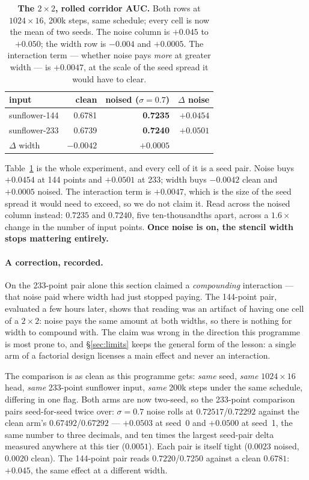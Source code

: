 \documentclass[10pt]{article}
\begin{document}
\begin{table}[htbp]
\centering\small
\begin{tabular}{lrrr}
\toprule
input & clean & noised ($\sigma{=}0.7$) & $\Delta$ noise \\
\midrule
sunflower-144 & 0.6781 & \textbf{0.7235} & $+0.0454$ \\
sunflower-233 & 0.6739 & \textbf{0.7240} & $+0.0501$ \\
\midrule
$\Delta$ width & $-0.0042$ & $+0.0005$ & \\
\bottomrule
\end{tabular}
\caption{\textbf{The $2\times2$, rolled corridor AUC.} Both rows at
$1024\times16$, 200k steps, same schedule; every cell is now the mean
of two seeds. The noise column is $+0.045$ to $+0.050$; the width row
is $-0.004$ and $+0.0005$. The interaction term --- whether noise pays
\emph{more} at greater width --- is $+0.0047$, at the scale of the seed
spread it would have to clear.}
\label{tab:twobytwo}
\end{table}

Table~\ref{tab:twobytwo} is the whole experiment, and every cell of it
is a seed pair. Noise buys $+0.0454$ at 144 points and $+0.0501$ at
233; width buys $-0.0042$ clean and $+0.0005$ noised. The interaction
term is $+0.0047$, which is the size of the seed spread it would need
to exceed, so we do not claim it. Read
across the noised column instead: $0.7235$ and $0.7240$, five
ten-thousandths apart, across a $1.6\times$ change in the number of
input points. \textbf{Once noise is on, the stencil width stops
mattering entirely.}

\paragraph{A correction, recorded.} On the 233-point pair alone this
section claimed a \emph{compounding} interaction --- that noise paid
where width had just stopped paying. The 144-point pair, evaluated a
few hours later, shows that reading was an artifact of having one cell
of a $2\times2$: noise pays the same amount at both widths, so there is
nothing for width to compound with. The claim was wrong in the direction
this programme is most prone to, and \S\ref{sec:limits} keeps the
general form of the lesson: a single arm of a factorial design licenses
a main effect and never an interaction.

The comparison is as clean as this programme gets: \emph{same} seed,
\emph{same} $1024\times16$ head, \emph{same} 233-point sunflower input,
\emph{same} 200k steps under the same schedule, differing in one flag.
Both arms are now two-seed, so the 233-point comparison pairs
seed-for-seed twice over: $\sigma{=}0.7$ noise rolls at
$0.72517$/$0.72292$ against the clean arm's $0.67492$/$0.67292$ ---
$\mathbf{+0.0503}$ at seed~0 and $\mathbf{+0.0500}$ at seed~1, the same
number to three decimals, and ten times the largest seed-pair delta
measured anywhere at this tier ($0.0051$). Each pair is itself tight
($0.0023$ noised, $0.0020$ clean). The 144-point pair reads
$0.7220$/$0.7250$ against a clean $0.6781$: $+0.045$, the same effect
at a different width.
\end{document}
